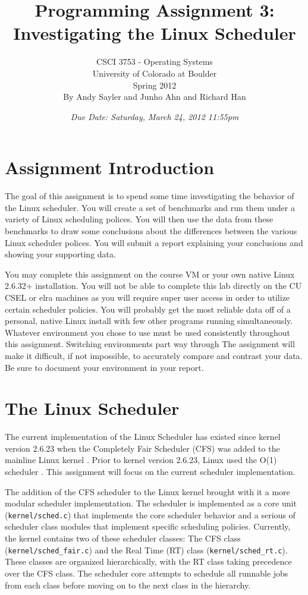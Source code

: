 \documentclass[12pt]{article}
\title{Programming Assignment 3:\\Investigating the Linux Scheduler}
\author{
  CSCI 3753 - Operating Systems\\
  University of Colorado at Boulder\\
  Spring 2012\\
  By Andy Sayler and Junho Ahn and Richard Han
}
\date{\emph{Due Date: Saturday, March 24, 2012 11:55pm}}
\begin{document}
\maketitle

\section{Assignment Introduction}

The goal of this assignment is to spend some time investigating the
behavior of the Linux scheduler. You will create a set of benchmarks
and run them under a variety of Linux scheduling polices. You will
then use the data from these benchmarks to draw some conclusions about
the differences between the various Linux scheduler polices. You will
submit a report explaining your conclusions and showing your
supporting data.

You may complete this assignment on the course VM or your own native
Linux 2.6.32+ installation. You will not be able to complete this lab
directly on the CU CSEL or elra machines as you will require super
user access in order to utilize certain scheduler policies.
You will probably get the most reliable data off of a personal, native
Linux install with few other programs running simultaneously. Whatever
environment you chose to use must be used consistently throughout this
assignment. Switching environments part way through The assignment
will make it difficult, if not impossible, to accurately compare and
contrast your data. Be sure to document your environment in your
report.

\section{The Linux Scheduler}

The current implementation of the Linux
Scheduler has existed since kernel version 2.6.23 when the Completely
Fair Scheduler (CFS) was added to the mainline Linux kernel
\cite{Molnar-CFS,Jones-InsideCFS,Kumar-MultiCFS}. Prior to kernel
version 2.6.23, Linux used the O(1) scheduler \cite{Le-StudyLKS}.
This assignment will focus on the current scheduler implementation.

The addition of the CFS scheduler to the Linux kernel brought with it
a more modular scheduler implementation. The scheduler is implemented as
a core unit (\texttt{kernel/sched.c}) that implements the core
scheduler behavior and a serious of scheduler class modules that
implement specific scheduling policies. Currently, the kernel contains
two of these scheduler classes: The CFS class
(\texttt{kernel/sched\_fair.c}) and the Real Time (RT) class
(\texttt{kernel/sched\_rt.c}). These classes are
organized hierarchically,
with the RT class taking precedence over the CFS class. The scheduler
core attempts to schedule all runnable jobs from each class before
moving on to the next class in the hierarchy.
\end{document}
